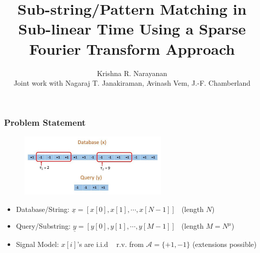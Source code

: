\documentclass[10pt,xcolor=table]{beamer}
\newcommand{\xv}{\underline{x}}
\newcommand{\yv}{\underline{y}}
\begin{document}
\title{Sub-string/Pattern Matching in Sub-linear Time Using a Sparse Fourier Transform Approach}
\author{ Krishna R. Narayanan \\
Joint work with Nagaraj T. Janakiraman, Avinash Vem, J.-F. Chamberland \\
}
\date{}
\frame{\titlepage}
\begin{frame}\frametitle{Problem Statement}
 	\vspace{-0.4cm}
	\begin{figure}[t]
		\centering
		\includegraphics[width=2.8in]{Pattern_matching_ex.pdf}
	\end{figure}
	\vspace{-10pt}
	\begin{block}{}
\begin{itemize}\itemsep5pt
	\item {\color{blue} Database/String}: $\xv = [x[0], x[1], \cdots, x[N-1]]$ \ (length $N$)
	\item { \color{blue} Query/Substring}: $\yv = [y[0], y[1], \cdots, y[M-1]]$ \ (length $M = N^\mu$)
	\item {\color{blue} Signal Model:} $x[i]$'s are i.i.d ~ r.v. from $\mathcal{A} = \{+1,-1\}$ (extensions possible)
\end{itemize}
\end{block}


\end{frame}
\end{document}

